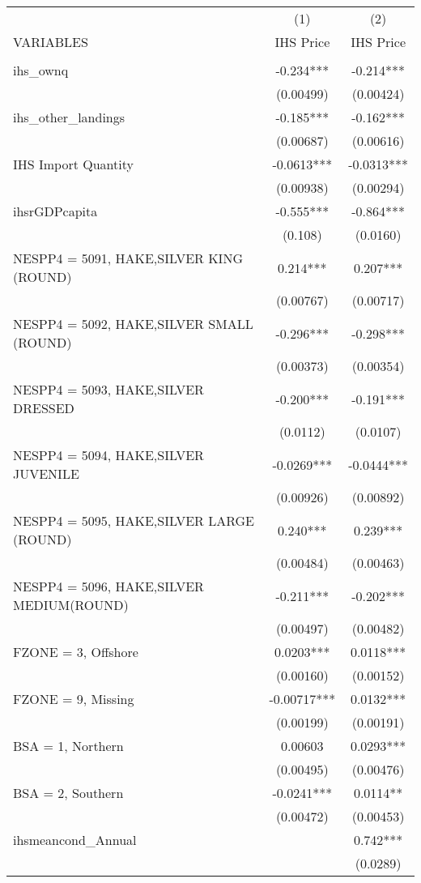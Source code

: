 \begin{tabular}{lcc} \hline
 & (1) & (2) \\
VARIABLES & IHS Price & IHS Price \\ \hline
 &  &  \\
ihs\_ownq & -0.234*** & -0.214*** \\
 & (0.00499) & (0.00424) \\
ihs\_other\_landings & -0.185*** & -0.162*** \\
 & (0.00687) & (0.00616) \\
IHS Import Quantity & -0.0613*** & -0.0313*** \\
 & (0.00938) & (0.00294) \\
ihsrGDPcapita & -0.555*** & -0.864*** \\
 & (0.108) & (0.0160) \\
NESPP4 = 5091, HAKE,SILVER KING (ROUND) & 0.214*** & 0.207*** \\
 & (0.00767) & (0.00717) \\
NESPP4 = 5092, HAKE,SILVER SMALL (ROUND) & -0.296*** & -0.298*** \\
 & (0.00373) & (0.00354) \\
NESPP4 = 5093, HAKE,SILVER DRESSED & -0.200*** & -0.191*** \\
 & (0.0112) & (0.0107) \\
NESPP4 = 5094, HAKE,SILVER JUVENILE & -0.0269*** & -0.0444*** \\
 & (0.00926) & (0.00892) \\
NESPP4 = 5095, HAKE,SILVER LARGE (ROUND) & 0.240*** & 0.239*** \\
 & (0.00484) & (0.00463) \\
NESPP4 = 5096, HAKE,SILVER MEDIUM(ROUND) & -0.211*** & -0.202*** \\
 & (0.00497) & (0.00482) \\
FZONE = 3, Offshore & 0.0203*** & 0.0118*** \\
 & (0.00160) & (0.00152) \\
FZONE = 9, Missing & -0.00717*** & 0.0132*** \\
 & (0.00199) & (0.00191) \\
BSA = 1, Northern & 0.00603 & 0.0293*** \\
 & (0.00495) & (0.00476) \\
BSA = 2, Southern & -0.0241*** & 0.0114** \\
 & (0.00472) & (0.00453) \\
ihsmeancond\_Annual &  & 0.742*** \\
 &  & (0.0289) \\

\end{tabular}
